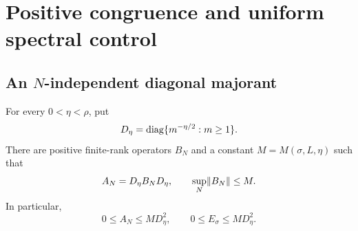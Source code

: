\section{Positive congruence and uniform spectral control}
\label{sec:tails}

\subsection{An \texorpdfstring{$N$}{N}-independent diagonal majorant}

\begin{proposition}
\label{prop:congruence}
For every $0<\eta<\rho$, put
\begin{equation}
 D_\eta=\operatorname{diag}\{m^{-\eta/2}:m\ge1\}.
 \label{eq:diagonal}
\end{equation}
There are positive finite-rank operators $B_N$ and a constant
$M=M(\sigma,L,\eta)$ such that
\begin{equation}
 A_N=D_\eta B_ND_\eta,\qquad
 \sup_N\lVert B_N\rVert\le M.
 \label{eq:factorization}
\end{equation}
In particular,
\begin{equation}
 0\le A_N\le M D_\eta^2,\qquad
 0\le E_\sigma\le M D_\eta^2.
 \label{eq:operator-majorant}
\end{equation}
\end{proposition}

